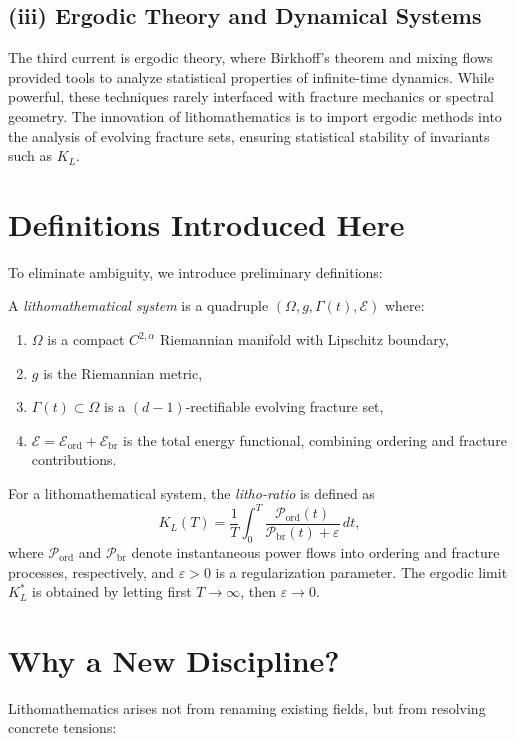\subsection*{(iii) Ergodic Theory and Dynamical Systems}
The third current is ergodic theory, where Birkhoff’s theorem and mixing flows provided tools to analyze statistical properties of infinite-time dynamics. While powerful, these techniques rarely interfaced with fracture mechanics or spectral geometry. The innovation of lithomathematics is to import ergodic methods into the analysis of evolving fracture sets, ensuring statistical stability of invariants such as $K_L$.

\section*{Definitions Introduced Here}
To eliminate ambiguity, we introduce preliminary definitions:

\begin{definition}
A \emph{lithomathematical system} is a quadruple $(\Omega,g,\Gamma(t),\mathcal{E})$ where:
\begin{enumerate}[label=(\alph*)]
\item $\Omega$ is a compact $C^{2,\alpha}$ Riemannian manifold with Lipschitz boundary,
\item $g$ is the Riemannian metric,
\item $\Gamma(t)\subset\Omega$ is a $(d-1)$-rectifiable evolving fracture set,
\item $\mathcal{E}=\mathcal{E}_{\mathrm{ord}}+\mathcal{E}_{\mathrm{br}}$ is the total energy functional, combining ordering and fracture contributions.
\end{enumerate}
\end{definition}

\begin{definition}
For a lithomathematical system, the \emph{litho-ratio} is defined as
\[
K_L(T) = \frac{1}{T}\int_0^T \frac{\mathcal{P}_{\mathrm{ord}}(t)}{\mathcal{P}_{\mathrm{br}}(t)+\varepsilon}\,dt,
\]
where $\mathcal{P}_{\mathrm{ord}}$ and $\mathcal{P}_{\mathrm{br}}$ denote instantaneous power flows into ordering and fracture processes, respectively, and $\varepsilon>0$ is a regularization parameter. The ergodic limit $K_L^*$ is obtained by letting first $T\to\infty$, then $\varepsilon\to 0$.
\end{definition}

\section*{Why a New Discipline?}
Lithomathematics arises not from renaming existing fields, but from resolving concrete tensions:

